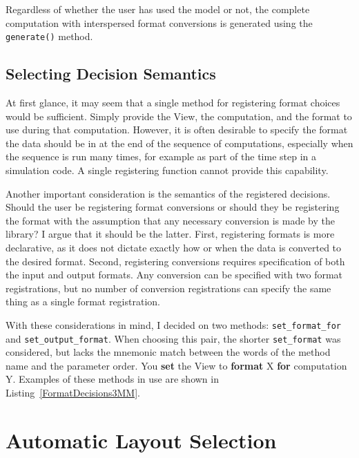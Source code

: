 Regardless of whether the user has used the model or not, 
the complete computation with interspersed format conversions is generated using the \verb.generate(). method.

\subsection{Selecting Decision Semantics}

At first glance, it may seem that a single method for registering format choices would be sufficient. 
Simply provide the View, the computation, and the format to use during that computation.
However, it is often desirable to specify the format the data should be in at the end of the sequence of computations, especially when the sequence is run many times, for example as part of the time step in a simulation code.
A single registering function cannot provide this capability. 

Another important consideration is the semantics of the registered decisions. 
Should the user be registering format conversions or should they be registering the format with the assumption that any necessary conversion is made by the library?
I argue that it should be the latter.
First, registering formats is more declarative, as it does not dictate exactly how or when the data is converted to the desired format.
Second, registering conversions requires specification of both the input and output formats. 
Any conversion can be specified with two format registrations, but no number of conversion registrations can specify the same thing as a single format registration.

With these considerations in mind, I decided on two methods: \verb.set_format_for. and \verb.set_output_format..
When choosing this pair, the shorter \verb.set_format. was considered, but lacks the mnemonic match between the words of the method name and the parameter order. You \textbf{set} the View to \textbf{format} X \textbf{for} computation Y. 
Examples of these methods in use are shown in Listing~\ref{FormatDecisions3MM}.


\section{Automatic Layout Selection}

